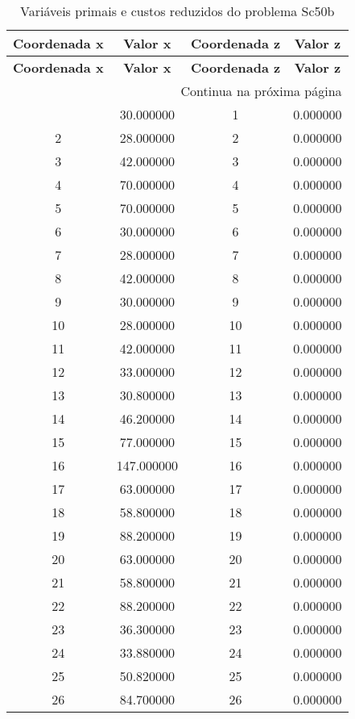 \documentclass[12pt]{article}
\begin{document}
\begin{longtable}{@{}cccc@{}}
\caption{Variáveis primais e custos reduzidos do problema Sc50b} \\
\toprule
\textbf{Coordenada x} & \textbf{Valor x} & \textbf{Coordenada z} & \textbf{Valor z} \\
\midrule
\endfirsthead

\toprule
\textbf{Coordenada x} & \textbf{Valor x} & \textbf{Coordenada z} & \textbf{Valor z} \\
\midrule
\endhead

\midrule \multicolumn{4}{r}{{Continua na próxima página}} \\ \midrule
\endfoot

\bottomrule
\endlastfoot
1 & 30.000000 & 1 & 0.000000 \\
2 & 28.000000 & 2 & 0.000000 \\
3 & 42.000000 & 3 & 0.000000 \\
4 & 70.000000 & 4 & 0.000000 \\
5 & 70.000000 & 5 & 0.000000 \\
6 & 30.000000 & 6 & 0.000000 \\
7 & 28.000000 & 7 & 0.000000 \\
8 & 42.000000 & 8 & 0.000000 \\
9 & 30.000000 & 9 & 0.000000 \\
10 & 28.000000 & 10 & 0.000000 \\
11 & 42.000000 & 11 & 0.000000 \\
12 & 33.000000 & 12 & 0.000000 \\
13 & 30.800000 & 13 & 0.000000 \\
14 & 46.200000 & 14 & 0.000000 \\
15 & 77.000000 & 15 & 0.000000 \\
16 & 147.000000 & 16 & 0.000000 \\
17 & 63.000000 & 17 & 0.000000 \\
18 & 58.800000 & 18 & 0.000000 \\
19 & 88.200000 & 19 & 0.000000 \\
20 & 63.000000 & 20 & 0.000000 \\
21 & 58.800000 & 21 & 0.000000 \\
22 & 88.200000 & 22 & 0.000000 \\
23 & 36.300000 & 23 & 0.000000 \\
24 & 33.880000 & 24 & 0.000000 \\
25 & 50.820000 & 25 & 0.000000 \\
26 & 84.700000 & 26 & 0.000000 \\

\end{longtable}
\end{document}
